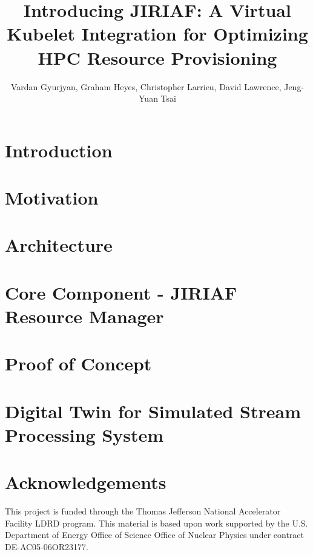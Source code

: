 \documentclass[a4paper,10pt]{article}
\title{Introducing JIRIAF: A Virtual Kubelet Integration for Optimizing HPC Resource Provisioning}
\author{Vardan Gyurjyan, Graham Heyes, Christopher Larrieu, David Lawrence, Jeng-Yuan Tsai}
\date{}
\begin{document}
\maketitle

\begin{abstract}

\end{abstract}

\tableofcontents
\newpage

\section{Introduction}


\section{Motivation}


\section{Architecture}


\section{Core Component - JIRIAF Resource Manager}


\section{Proof of Concept}


\section{Digital Twin for Simulated Stream Processing System}


\section*{Acknowledgements}
This project is funded through the Thomas Jefferson National Accelerator Facility LDRD program. This material is based upon work supported by the U.S. Department of Energy Office of Science Office of Nuclear Physics under contract DE-AC05-06OR23177.



\end{document}
